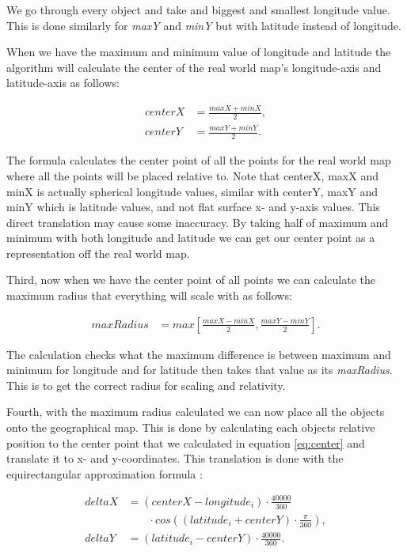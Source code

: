 We go through every object and take and biggest and smallest longitude value. This is done similarly for \textit{maxY} and \textit{minY} but with latitude instead of longitude.

When we have the maximum and minimum value of longitude and latitude the algorithm will calculate the center of the real world map's longitude-axis and latitude-axis as follows:

\begin{align}
\label{eq:center}
centerX &= \frac{maxX+minX}{2},  \\
centerY &= \frac{maxY+minY}{2}. \nonumber
\end{align}

The formula calculates the center point of all the points for the real world map where all the points will be placed relative to. Note that centerX, maxX and minX is actually spherical longitude values, similar with centerY, maxY and minY which is latitude values, and not flat surface x- and y-axis values. This direct translation may cause some inaccuracy. By taking half of maximum and minimum with both longitude and latitude we can get our center point as a representation off the real world map.
 
Third, now when we have the center point of all points we can calculate the maximum radius that everything will scale with as follows:

\begin{align}
\label{eq:radius}
maxRadius &= max[\frac{maxX-minX}{2}, \frac{maxY-minY}{2}].
\end{align}

The calculation checks what the maximum difference is between maximum and minimum for longitude and for latitude then takes that value as its \textit{maxRadius}. This is to get the correct radius for scaling and relativity.

Fourth, with the maximum radius calculated we can now place all the objects onto the geographical map. This is done by calculating each objects relative position to the center point that we calculated in equation \ref{eq:center} and translate it to x- and y-coordinates. This translation is done with the equirectangular approximation formula \cite{equi}:

\begin{align}
\label{eq:equiretangular}
deltaX &= (centerX-longitude_i)\cdot\frac{40000}{360} \\
 &\phantom{b=\,} \cdot cos((latitude_i+centerY) \cdot \frac{\pi}{360}), \nonumber\\
deltaY &= (latitude_i-centerY)\cdot\frac{40000}{360}. \nonumber
\end{align}

